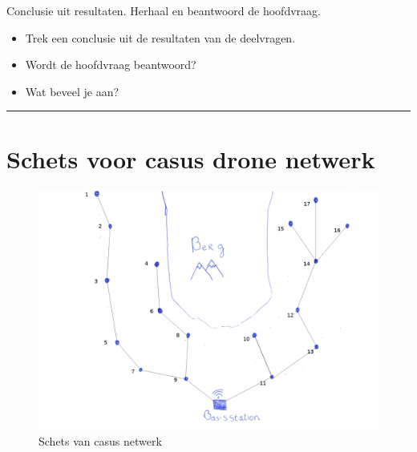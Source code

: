 \documentclass[a4paper, 11pt, oneside]{report}
\begin{document}
\label{chapter:conclusie}
Conclusie uit resultaten. Herhaal en beantwoord de hoofdvraag.
\begin{itemize}
\item Trek een conclusie uit de resultaten van de deelvragen.
\item Wordt de hoofdvraag beantwoord?
\item Wat beveel je aan?
\end{itemize}
\hrule





\clearpage
\appendix
\chapter{Schets voor casus drone netwerk}
 \label{app:schetsNetwerk}
\begin{figure}[H]
	\begin{center}\includegraphics[width=\linewidth]{schetsNetwerk}\end{center}
	\caption{Schets van casus netwerk}
	\label{fig:schetsNetwerk}
\end{figure}
\end{document}
